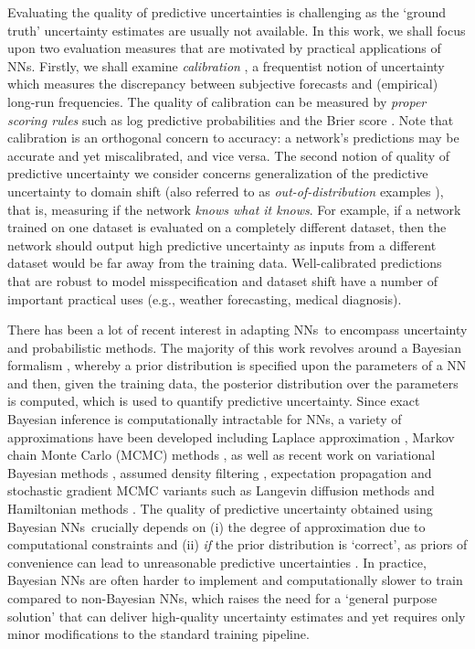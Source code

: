 \documentclass{article}
\newcommand{\nn}{NNs}
\begin{document}
Evaluating the quality of predictive uncertainties is challenging as the `ground truth' uncertainty estimates are usually not available. %
In this work, we shall focus upon two evaluation measures that are motivated by practical applications of \nn.
Firstly, we shall examine \emph{calibration} \citep{degroot1983comparison,dawid1982well}, a frequentist notion of uncertainty 
which measures the discrepancy between subjective forecasts and (empirical) long-run frequencies. 
The quality of calibration can be measured 
 by \emph{proper scoring rules} \citep{gneiting2007strictly} such as log predictive probabilities and the Brier score \citep{brier1950verification}.
Note that calibration is an orthogonal concern to accuracy: a network's predictions may be accurate and yet miscalibrated, and vice versa. %
The second notion of quality of predictive uncertainty we consider concerns %
generalization of the predictive uncertainty to domain shift (also referred to as \emph{out-of-distribution} examples \citep{hendrycks2016baseline}), that is, measuring if the network \emph{knows what it knows}. %
For example, if a network trained on one dataset is evaluated on a completely different dataset, then the network should output high  predictive uncertainty as inputs from a different dataset would be far away from the training data. 
Well-calibrated predictions that are robust to model misspecification and dataset shift have a number of important practical uses (e.g., weather forecasting, medical diagnosis). 

There has been a lot of recent interest in adapting \nn~to encompass uncertainty and probabilistic methods. 
The majority of this work revolves around a Bayesian formalism \citep{bernardo2009bayesian}, whereby a prior distribution is specified upon the parameters of a NN and then, given the training data, 
the posterior distribution over the parameters is computed, which is used to quantify predictive uncertainty.  
Since exact Bayesian inference is computationally intractable for \nn, a variety of approximations have been developed including Laplace approximation \citep{mackay1992bayesian}, Markov chain Monte Carlo (MCMC) methods \citep{Neal96}, as well as recent work on variational Bayesian methods \citep{graves,BBB,louizos2016structured}, assumed density filtering \citep{PB}, expectation propagation \citep{SEP, snep} and stochastic gradient MCMC variants such as Langevin diffusion methods \citep{sgld,bayesiandark} and Hamiltonian methods \citep{springenberg2016bayesian}. 
The quality of predictive uncertainty obtained using Bayesian \nn~crucially depends on (i) the degree of approximation due to computational constraints 
 and (ii) \emph{if} the prior distribution is `correct', %
as priors of convenience can lead to unreasonable predictive uncertainties \citep{rasmussen2005healing}. 
In practice, Bayesian NNs are often harder to implement and computationally slower to train  compared to non-Bayesian \nn, which raises the need for a `general purpose solution' that can deliver high-quality uncertainty estimates and yet requires only minor modifications to the standard training pipeline. 
\end{document}

